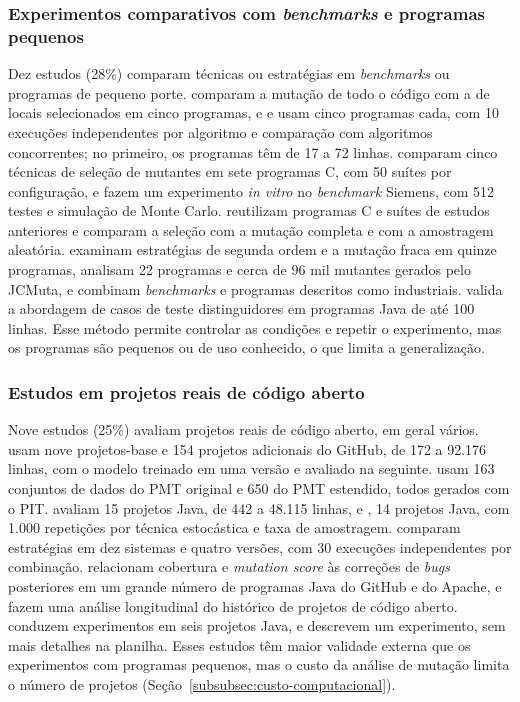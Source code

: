 \subsubsection{Experimentos comparativos com \textit{benchmarks} e programas pequenos}
\label{subsubsec:experimentos-comparativos}

Dez estudos (28\%) comparam técnicas ou estratégias em \textit{benchmarks} ou programas de pequeno porte.  comparam a mutação de todo o código com a de locais selecionados em cinco programas, e  e  usam cinco programas cada, com 10 execuções independentes por algoritmo e comparação com algoritmos concorrentes; no primeiro, os programas têm de 17 a 72 linhas.  comparam cinco técnicas de seleção de mutantes em sete programas C, com 50 suítes por configuração, e  fazem um experimento \textit{in vitro} no \textit{benchmark} Siemens, com 512 testes e simulação de Monte Carlo.  reutilizam programas C e suítes de estudos anteriores e comparam a seleção com a mutação completa e com a amostragem aleatória.  examinam estratégias de segunda ordem e a mutação fraca em quinze programas,  analisam 22 programas e cerca de 96 mil mutantes gerados pelo JCMuta, e  combinam \textit{benchmarks} e programas descritos como industriais.  valida a abordagem de casos de teste distinguidores em programas Java de até 100 linhas. Esse método permite controlar as condições e repetir o experimento, mas os programas são pequenos ou de uso conhecido, o que limita a generalização.

\subsubsection{Estudos em projetos reais de código aberto}
\label{subsubsec:estudos-projetos-reais}

Nove estudos (25\%) avaliam projetos reais de código aberto, em geral vários.  usam nove projetos-base e 154 projetos adicionais do GitHub, de 172 a 92.176 linhas, com o modelo treinado em uma versão e avaliado na seguinte.  usam 163 conjuntos de dados do PMT original e 650 do PMT estendido, todos gerados com o PIT.  avaliam 15 projetos Java, de 442 a 48.115 linhas, e , 14 projetos Java, com 1.000 repetições por técnica estocástica e taxa de amostragem.  comparam estratégias em dez sistemas e quatro versões, com 30 execuções independentes por combinação.  relacionam cobertura e \textit{mutation score} às correções de \textit{bugs} posteriores em um grande número de programas Java do GitHub e do Apache, e  fazem uma análise longitudinal do histórico de projetos de código aberto.  conduzem experimentos em seis projetos Java, e  descrevem um experimento, sem mais detalhes na planilha. Esses estudos têm maior validade externa que os experimentos com programas pequenos, mas o custo da análise de mutação limita o número de projetos (Seção~\ref{subsubsec:custo-computacional}).

